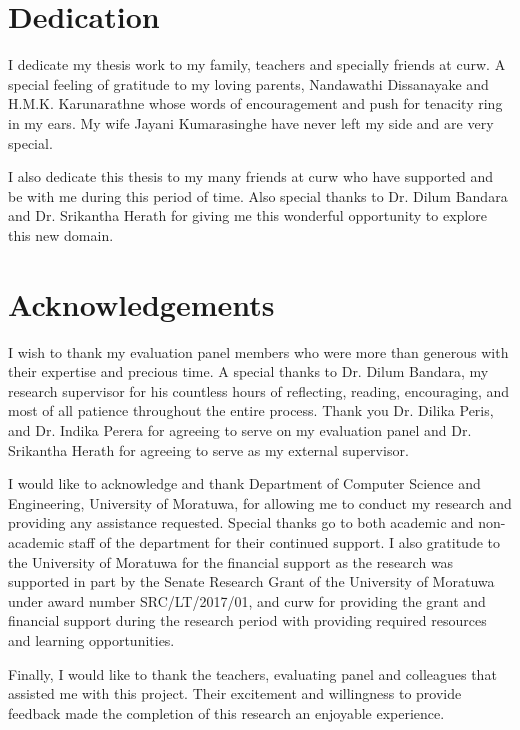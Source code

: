 \documentclass[a4paper,oneside,12pt]{report}
\begin{document}
\chapter*{Dedication}
I dedicate my thesis work to my family, teachers and specially friends at \acrfull{curw}. A special feeling of gratitude to my loving parents, Nandawathi Dissanayake and H.M.K. Karunarathne whose words of encouragement and push for tenacity ring in my ears. My wife Jayani Kumarasinghe have never left my side and are very special.

I also dedicate this thesis to my many friends at \acrshort{curw} who have supported and be with me during this period of time. Also special thanks to Dr. Dilum Bandara and Dr. Srikantha Herath for giving me this wonderful opportunity to explore this new domain.

\chapter*{Acknowledgements}
I wish to thank my evaluation panel members who were more than generous with their expertise and precious time. A special thanks to Dr. Dilum Bandara, my research supervisor for his countless hours of reflecting, reading, encouraging, and most of all patience throughout the entire process. Thank you Dr. Dilika Peris, and Dr. Indika Perera for agreeing to serve on my evaluation panel and Dr. Srikantha Herath for agreeing to serve as my external supervisor.

I would like to acknowledge and thank Department of Computer Science and Engineering, University of Moratuwa, for allowing me to conduct my research and providing any assistance requested. Special thanks go to both academic and non-academic staff of the department for their continued support. I also gratitude to the University of Moratuwa for the financial support as the research was supported in part by the Senate Research Grant of the University of Moratuwa under award number SRC/LT/2017/01,  and \acrfull{curw} for providing the grant and financial support during the research period with providing required resources and learning opportunities.

Finally, I would like to thank the teachers, evaluating panel and colleagues that assisted me with this project. Their excitement and willingness to provide feedback made the completion of this research an enjoyable experience.
\end{document}
